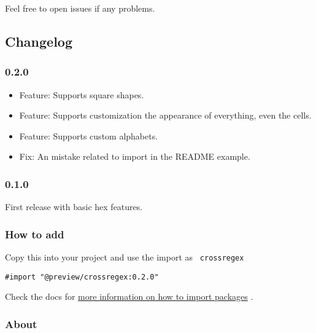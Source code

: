 Feel free to open issues if any problems.

\subsection{Changelog}\label{changelog}

\subsubsection{0.2.0}\label{section}

\begin{itemize}
\tightlist
\item
  Feature: Supports square shapes.
\item
  Feature: Supports customization the appearance of everything, even the
  cells.
\item
  Feature: Supports custom alphabets.
\item
  Fix: An mistake related to import in the README example.
\end{itemize}

\subsubsection{0.1.0}\label{section-1}

First release with basic hex features.

\subsubsection{How to add}\label{how-to-add}

Copy this into your project and use the import as
\texttt{\ crossregex\ }

\begin{verbatim}
#import "@preview/crossregex:0.2.0"
\end{verbatim}



Check the docs for
\href{https://typst.app/docs/reference/scripting/\#packages}{more
information on how to import packages} .

\subsubsection{About}\label{about}

